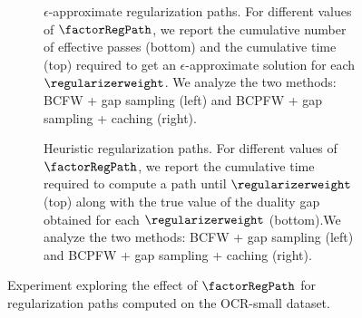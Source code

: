 \documentclass{article}
\begin{document}
\begin{figure*}[h!]
    \centering
    \begin{subfigure}[b]{0.48\textwidth}
    \caption{
        \label{fig:regPath_epsApprox_ocrSmall} $\epsilon$-approximate regularization paths. 
        For different values of $\factorRegPath$, we report the cumulative number of effective passes (bottom) and the cumulative time (top) required to get an $\epsilon$-approximate solution for each $\regularizerweight$. We analyze the two methods: BCFW + gap sampling (left) and BCPFW + gap sampling + caching (right).
    }
    \end{subfigure}
     \hfill
    \begin{subfigure}[b]{0.48\textwidth}
    \caption{
        \label{fig:regPath_heuristic_ocrSmall} Heuristic regularization paths.
        For different values of $\factorRegPath$, we report the cumulative time required to compute a path until $\regularizerweight$ (top) along with the true value of the duality gap obtained for each $\regularizerweight$ (bottom).We analyze the two methods: BCFW + gap sampling (left) and BCPFW + gap sampling + caching (right).
    }
    \end{subfigure}
	\caption{Experiment exploring the effect of $\factorRegPath$ for regularization paths computed on the OCR-small dataset.}
	\label{fig:bigFigure}
\end{figure*}
\end{document}
